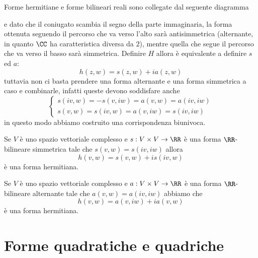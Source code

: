 \documentclass[11pt]{scrartcl}
\begin{document}
	Forme hermitiane e forme bilineari reali sono collegate dal seguente diagramma
	\begin{center}
	\end{center}
	e dato che il coniugato scambia il segno della parte immaginaria, la forma ottenuta seguendo il percorso che va verso l'alto sarà antisimmetrica (alternante, in quanto $\CC$ ha caratteristica diversa da $2$), mentre quella che segue il percorso che va verso il basso sarà simmetrica. Definire $H$ allora è equivalente a definire $s$ ed $a$:
	$$h(z,w)=s(z,w)+ia(z,w)$$
	tuttavia non ci basta prendere una forma alternante e una forma simmetrica a caso e combinarle, infatti queste devono soddisfare anche
	$$
	\begin{cases}
		s(iv,w) = -s(v,iw) = a(v,w)=a(iv,iw) \\
		s(v,w)  =  s(iv,w) = a(v,iw)=s(iv,iw)
	\end{cases}
	$$
	in questo modo abbiamo costruito una corrispondenza biunivoca.
	\begin{lemma}
		Se $V$ è uno spazio vettoriale complesso e $s:V\times V\to\RR$ è una forma $\RR$-bilineare simmetrica tale che
		$s(v,w)=s(iv,iw)$ allora
		$$h(v,w)=s(v,w)+is(iv,w)$$
		è una forma hermitiana.
	\end{lemma}
	\begin{lemma}
		Se $V$ è uno spazio vettoriale complesso e $a:V\times V\to\RR$ è una forma  $\RR$-bilineare alternante tale che $a(v,w)=a(iv,iw)$ abbiamo che 
		$$h(v,w)=a(v,iw)+ia(v,w)$$
		è una forma hermitiana.
	\end{lemma}

	\newpage
	
	\section{Forme quadratiche e quadriche}
	
\end{document}
